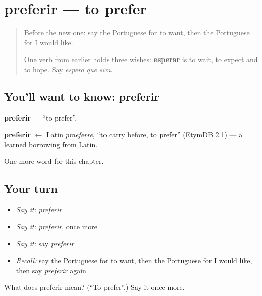 \section[preferir]{preferir — to prefer}

\label{lesson:PT-C83-preferir}



\begin{quote}
Before the new one: say the Portuguese for to want, then the Portuguese for I would like.

One verb from earlier holds three wishes: \textbf{esperar} is to wait, to expect and to hope. Say \emph{espero que sim}.
\end{quote}

\subsection*{You'll want to know: preferir}
\textbf{preferir} — \textquotedblleft{}to prefer\textquotedblright{}.

\begin{cousinweb}
\textbf{preferir} $\leftarrow$ Latin \emph{praeferre}, \textquotedblleft{}to carry before, to prefer\textquotedblright{} (EtymDB 2.1) — a learned borrowing from Latin.
\end{cousinweb}

\begin{grammarlens}[title={What you've built}]
One more word for this chapter.
\end{grammarlens}

\subsection*{Your turn}
\begin{itemize}
\raggedright
  \item \emph{Say it:} \emph{preferir}
  \item \emph{Say it:} \emph{preferir}, once more
  \item \emph{Say it:} say \emph{preferir}
  \item \emph{Recall:} say the Portuguese for to want, then the Portuguese for I would like, then say \emph{preferir} again
\end{itemize}

\begin{tcolorbox}[breakable,colback=teal!4,colframe=teal!35!black,title={Before you move on}]
What does preferir mean? (\textquotedblleft{}To prefer\textquotedblright{}.) Say it once more.
\end{tcolorbox}
